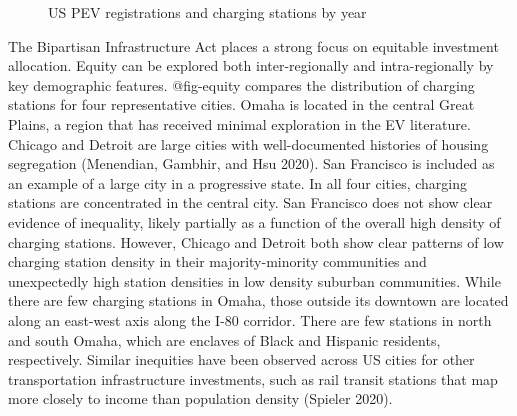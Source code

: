 \documentclass[
  letterpaper,
  DIV=11,
  numbers=noendperiod]{scrartcl}
\begin{document}
\begin{figure}

\begin{minipage}[t]{\linewidth}

{\centering 


\caption{\label{fig-us-totals}US PEV registrations and charging stations
by year}

}

\end{minipage}%

\end{figure}

The Bipartisan Infrastructure Act places a strong focus on equitable
investment allocation. Equity can be explored both inter-regionally and
intra-regionally by key demographic features. @fig-equity compares the
distribution of charging stations for four representative cities. Omaha
is located in the central Great Plains, a region that has received
minimal exploration in the EV literature. Chicago and Detroit are large
cities with well-documented histories of housing segregation (Menendian,
Gambhir, and Hsu 2020). San Francisco is included as an example of a
large city in a progressive state. In all four cities, charging stations
are concentrated in the central city. San Francisco does not show clear
evidence of inequality, likely partially as a function of the overall
high density of charging stations. However, Chicago and Detroit both
show clear patterns of low charging station density in their
majority-minority communities and unexpectedly high station densities in
low density suburban communities. While there are few charging stations
in Omaha, those outside its downtown are located along an east-west axis
along the I-80 corridor. There are few stations in north and south
Omaha, which are enclaves of Black and Hispanic residents, respectively.
Similar inequities have been observed across US cities for other
transportation infrastructure investments, such as rail transit stations
that map more closely to income than population density (Spieler 2020).
\end{document}
